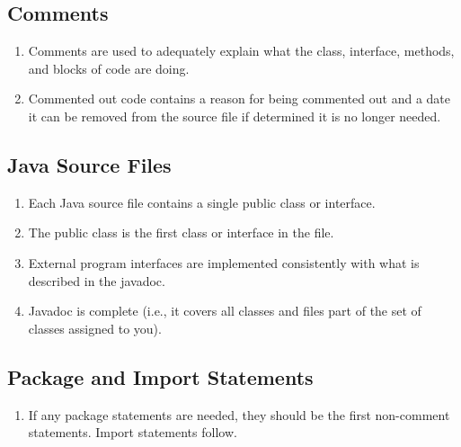 \documentclass{article}
\begin{document}
\subsection*{Comments}\begin{enumerate}[resume]
\item Comments are used to adequately explain what the class, interface, methods, and blocks of code are doing.
\item Commented out code contains a reason for being commented out and a date it can be removed from the source file if determined it is no longer needed.
\end{enumerate}

\subsection*{Java Source Files}\begin{enumerate}[resume]
\item Each Java source file contains a single public class or interface.
\item The public class is the first class or interface in the file.
\item External program interfaces are implemented consistently with what is described in the javadoc.
\item Javadoc is complete (i.e., it covers all classes and files part of the set of classes assigned to you).
\end{enumerate}

\subsection*{Package and Import Statements}\begin{enumerate}[resume]
\item If any package statements are needed, they should be the first non-comment statements. Import statements follow.
\end{enumerate}
\end{document}
